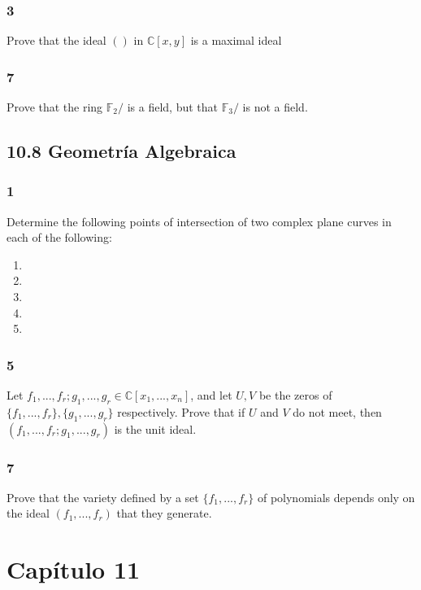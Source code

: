 \documentclass[11pt]{article}
\newcommand{\set}[1]{\mathbb{#1}}
\theoremstyle{definition}
\begin{document}
        \subsubsection{3}
        Prove that the ideal $()$ in $\set{C}[x,y]$ is a maximal ideal

        \subsubsection{7}
        Prove that the ring $\set{F}_2/$ is a field, but that $\set{F}_3/$ is not a field.

        \subsection{10.8 Geometría Algebraica}
        \subsubsection{1}
        Determine the following points of intersection of two complex plane curves in each of the following:
        \begin{enumerate}[label=\textbf{(\alph*)}]
            \item

            \item

            \item

            \item

            \item
        \end{enumerate}

        \subsubsection{5}
        Let $f_1,...,f_r;g_1,...,g_r\in\set{C}[x_1,...,x_n]$, and let $U,V$ be the zeros of $\{f_1,...,f_r\},\{g_1,...,g_r\}$ respectively. Prove that if $U$ and $V$ do not meet, then $(f_1,...,f_r;g_1,...,g_r)$ is the unit ideal.

        \subsubsection{7}
        Prove that the variety defined by a set $\{f_1,...,f_r\}$ of polynomials depends only on the ideal $(f_1,...,f_r)$ that they generate.

        \section{Capítulo 11}
\end{document}
